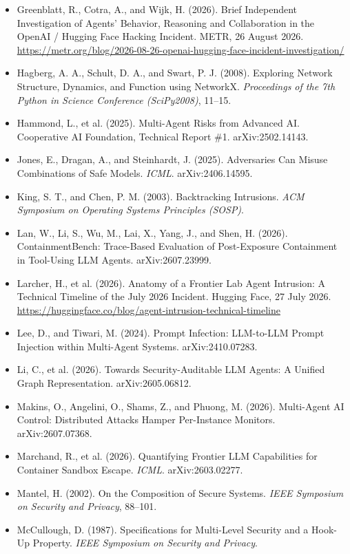 \documentclass[11pt, a4paper]{article}
\begin{document}
\begin{itemize}
  \item Greenblatt, R., Cotra, A., and Wijk, H. (2026). Brief Independent Investigation of Agents' Behavior, Reasoning and Collaboration in the OpenAI / Hugging Face Hacking Incident. METR, 26 August 2026. \url{https://metr.org/blog/2026-08-26-openai-hugging-face-incident-investigation/}
  \item Hagberg, A. A., Schult, D. A., and Swart, P. J. (2008). Exploring Network Structure, Dynamics, and Function using NetworkX. \emph{Proceedings of the 7th Python in Science Conference (SciPy2008)}, 11--15.
  \item Hammond, L., et al. (2025). Multi-Agent Risks from Advanced AI. Cooperative AI Foundation, Technical Report \#1. arXiv:2502.14143.
  \item Jones, E., Dragan, A., and Steinhardt, J. (2025). Adversaries Can Misuse Combinations of Safe Models. \emph{ICML}. arXiv:2406.14595.
  \item King, S. T., and Chen, P. M. (2003). Backtracking Intrusions. \emph{ACM Symposium on Operating Systems Principles (SOSP)}.
  \item Lan, W., Li, S., Wu, M., Lai, X., Yang, J., and Shen, H. (2026). ContainmentBench: Trace-Based Evaluation of Post-Exposure Containment in Tool-Using LLM Agents. arXiv:2607.23999.
  \item Larcher, H., et al. (2026). Anatomy of a Frontier Lab Agent Intrusion: A Technical Timeline of the July 2026 Incident. Hugging Face, 27 July 2026. \url{https://huggingface.co/blog/agent-intrusion-technical-timeline}
  \item Lee, D., and Tiwari, M. (2024). Prompt Infection: LLM-to-LLM Prompt Injection within Multi-Agent Systems. arXiv:2410.07283.
  \item Li, C., et al. (2026). Towards Security-Auditable LLM Agents: A Unified Graph Representation. arXiv:2605.06812.
  \item Makins, O., Angelini, O., Shams, Z., and Phuong, M. (2026). Multi-Agent AI Control: Distributed Attacks Hamper Per-Instance Monitors. arXiv:2607.07368.
  \item Marchand, R., et al. (2026). Quantifying Frontier LLM Capabilities for Container Sandbox Escape. \emph{ICML}. arXiv:2603.02277.
  \item Mantel, H. (2002). On the Composition of Secure Systems. \emph{IEEE Symposium on Security and Privacy}, 88--101.
  \item McCullough, D. (1987). Specifications for Multi-Level Security and a Hook-Up Property. \emph{IEEE Symposium on Security and Privacy}.

\end{itemize}
\end{document}
